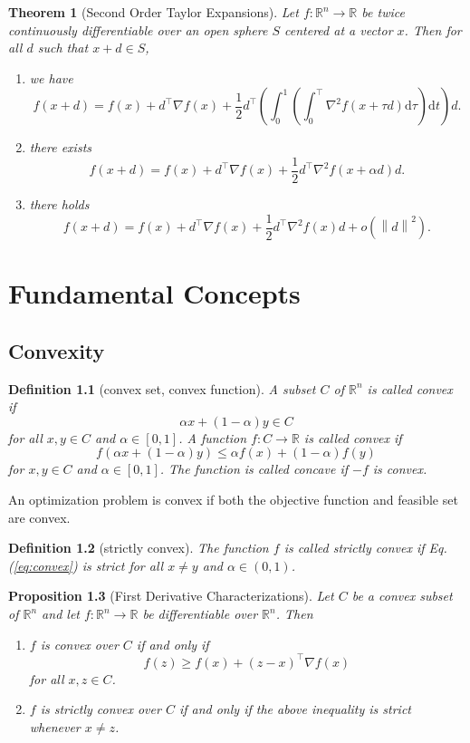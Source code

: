 \documentclass[12pt,a4paper]{report}
\numberwithin{equation}{section}
\theoremstyle{mystyle}
\newtheorem{definition}{Definition}[section]
\newtheorem{theorem}[definition]{Theorem}
\newtheorem{proposition}[definition]{Proposition}
\newcommand{\R}{\mathbb{R}}
\newcommand{\grad}{\nabla}
\renewcommand{\d}{\mathrm{d}}
\newcommand{\T}{\top}
\newcommand{\norm}[1]{\left\lVert #1 \right\rVert}
\begin{document}
	\begin{theorem}[Second Order Taylor Expansions]
		Let $f:\R^n \to \R$ be twice continuously differentiable over an open sphere $S$ centered at a vector $x$. Then for all $d$ such that $x+d\in S$,
		\begin{enumerate}
			\item we have
			$$
			f(x+d)=f(x)+d^\T \grad f(x) +\frac{1}{2}d^\T\left(\int_0^1\left(\int_0^\T \grad^2 f(x+\tau d)\d \tau\right)\d t\right)d.
			$$
			\item there exists
			$$
			f(x+d)=f(x)+d^\T \grad f(x)+\frac{1}{2}d^\T \grad^2 f(x+\alpha d)d.
			$$
			\item there holds
			$$
			f(x+d)=f(x)+d^\T \grad f(x)+\frac{1}{2}d^\T \grad^2 f(x)d+o(\norm{d}^2).
			$$
		\end{enumerate}
	\end{theorem}

	
	
	
	
	
	\chapter{Fundamental Concepts}
	\section{Convexity}
	\begin{definition}[convex set, convex function]
		A subset $C$ of $\R^n$ is called \emph{convex} if 
		$$
		\alpha x+(1-\alpha)y\in C
		$$ for all $x,y\in C$ and $\alpha\in [0,1]$. A function $f:C\to \R$ is called \emph{convex} if 
		\begin{equation}
			f(\alpha x+(1-\alpha )y)\leq 
			\alpha f(x)+(1-\alpha)f(y)\label{eq:convex}
		\end{equation}
		for $x,y\in C$ and $\alpha\in [0,1]$. The function is called \emph{concave} if $-f$ is convex.
	\end{definition}
	
	An optimization problem is convex if both the objective function and feasible set are convex.


	\begin{definition}[strictly convex]
		The function $f$ is called \emph{strictly convex} if Eq.(\ref{eq:convex}) is strict for all $x\neq y$ and $\alpha\in(0,1)$.
	\end{definition}

	\begin{proposition}[First Derivative Characterizations]
		Let $C$ be a convex subset of $\R^n$ and let $f:\R^n \to \R$ be differentiable over $\R^n$. Then
		\begin{enumerate}
			\item $f$ is convex over $C$ if and only if
			\begin{equation}
				f(z)\geq f(x)+(z-x)^\T \grad f(x)
			\end{equation}
			for all $x,z\in C$.
			\item $f$ is strictly convex over $C$ if and only if the above inequality is strict whenever $x\neq z$.
		\end{enumerate}
	\end{proposition}
\end{document}
